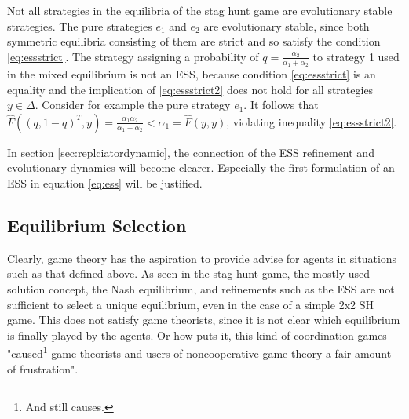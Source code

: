 \documentclass[11pt]{article}
\begin{document}
Not all strategies in the equilibria of the stag hunt game are evolutionary
stable strategies. The pure strategies $e_1$ and $e_2$ are evolutionary stable,
since both symmetric equilibria consisting of them are strict and so 
satisfy the condition \eqref{eq:essstrict}. The strategy assigning 
a probability of $q=\frac{\alpha_2}{\alpha_1 + \alpha_2}$ to strategy 1 used in the 
mixed equilibrium is not an ESS, because condition \eqref{eq:essstrict} is
an equality and the implication of \eqref{eq:essstrict2} does not hold for all
strategies $y \in \Delta$.
Consider for example the pure strategy $e_1$. It follows that
$\hat{F}((q,1-q)^T,y) = \frac{\alpha_1 \alpha_2}{\alpha_1+\alpha_2}
< \alpha_1 = \hat{F}(y,y)$, violating inequality \eqref{eq:essstrict2}.

In section \ref{sec:replciatordynamic}, the connection of the ESS refinement
and evolutionary dynamics will become clearer. Especially the first formulation
of an ESS in equation \eqref{eq:ess} will be justified.

\subsection{Equilibrium Selection}
\label{sec:equilibriumselection}
Clearly, game theory has the aspiration to provide advise for agents in 
situations such as that defined above.
As seen in the stag hunt game, the mostly used solution concept, 
the Nash equilibrium, and refinements such as the ESS are
not sufficient to select a unique equilibrium, even in the case of a simple
2x2 SH game. This does not satisfy game theorists, since it is not clear which
equilibrium is finally played by the agents. Or how 
\textcite{weibull_evolutionary_1997} puts it, this kind of coordination games 
"caused\footnote{And still causes.} game theorists and users of 
noncooperative game theory a fair amount of frustration". 
\end{document}
